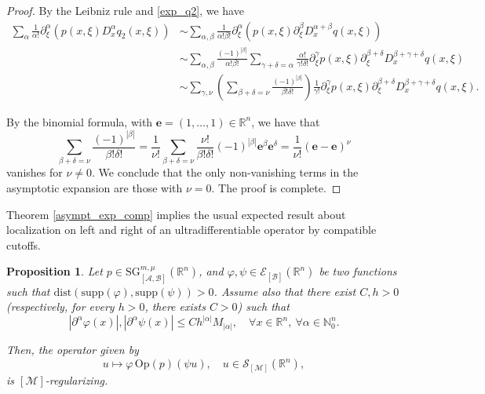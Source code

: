 \documentclass[11pt,reqno]{amsart}
\numberwithin{equation}{section}
\newtheorem{proposition}[theorem]{Proposition}
\newcommand{\R}{{\mathbb{R}}} %
\newcommand{\N}{{\mathbb{N}}} %
\newcommand{\SG}{{\mathrm{SG}}}
\newcommand{\M}{{\mathcal{M}}} %
\newcommand{\A}{{\mathcal{A}}} %
\newcommand{\B}{{\mathcal{B}}} %
\begin{document}
\begin{proof}
	By the Leibniz rule and \eqref{exp_q2}, we have
	\begin{align*}
		\sum_{\alpha}\frac{1}{\alpha!}\partial_\xi^\alpha\left( p(x,\xi) D_x^\alpha q_2(x,\xi)\right) & \sim \sum_{\alpha,\beta}\frac{1}{\alpha!\beta!}\partial_\xi^\alpha\left( p(x,\xi) \partial_\xi^\beta D_x^{\alpha+\beta}q(x,\xi)\right)\\
		& \sim \sum_{\alpha,\beta}\frac{(-1)^{|\beta|}}{\alpha!\beta!}\sum_{\gamma+\delta=\alpha}\frac{\alpha!}{\gamma!\delta!}\partial_\xi^{\gamma}p(x,\xi)\partial_\xi^{\beta+\delta}D_x^{\beta+\gamma+\delta}q(x,\xi)\\
		& \sim \sum_{\gamma,\nu}\left(\sum_{\beta+\delta=\nu}\frac{(-1)^{|\beta|}}{\beta!\delta!}\right) \frac{1}{\gamma!}\partial_\xi^{\gamma}p(x,\xi)\partial_\xi^{\beta+\delta}D_x^{\beta+\gamma+\delta}q(x,\xi).
	\end{align*}
%
	
	By the binomial formula, with $\boldsymbol{e}=(1,\dots,1)\in\R^n$, we have that
	\begin{equation*}
		\sum_{\beta+\delta=\nu}\frac{(-1)^{|\beta|}}{\beta!\delta!} = \frac{1}{\nu!}\sum_{\beta+\delta=\nu}\frac{\nu!}{\beta!\delta!}(-1)^{|\beta|}\boldsymbol{e}^\beta \boldsymbol{e}^\delta
		=
		\frac{1}{\nu!} (\boldsymbol{e}-\boldsymbol{e})^{\nu}
	\end{equation*}
	vanishes for $\nu\not=0$.
	We conclude that the only non-vanishing terms in the asymptotic expansion are those with $\nu=0$. The proof is complete.	
\end{proof}


Theorem \ref{asympt_exp_comp} implies the usual expected result about localization on left and right of an ultradifferentiable operator by compatible cutoffs.

\begin{proposition}\label{disj_supp}
	Let $p\in {\SG}_{[\A,\B]}^{m,\mu}(\R^n)$, and $\varphi,\psi\in\mathcal{E}_{[\B]}(\R^n)$ be two functions such that $\mathrm{dist}(\mathrm{supp}(\varphi),\mathrm{supp}(\psi))>0$. Assume also that there exist $C,h>0$ (respectively, for every $h>0$, there exists $C>0$) such that
	\[|\partial^{\alpha}\varphi(x)|,|\partial^\alpha\psi(x)|\leq Ch^{|\alpha|}M_{|\alpha|},\quad \forall x\in\R^n,\ \forall \alpha\in\N_0^n.\]
	
	Then, the operator given by
	\[u\mapsto  \varphi\,\mathrm{Op}(p)(\psi u),\quad u\in\mathcal{S}_{[\M]}(\mathbb{R}^n),\]
	is $[\M]$-regularizing.
\end{proposition}
\end{document}
